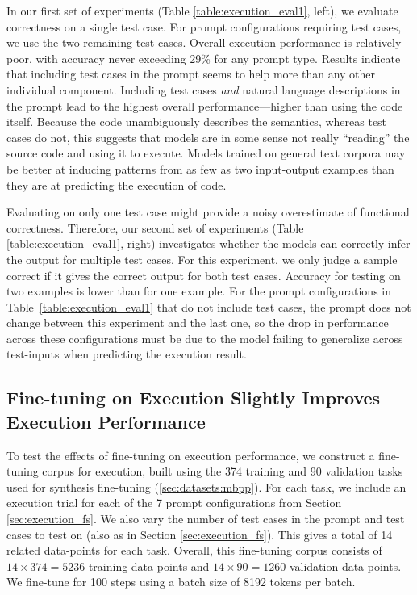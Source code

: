 In our first set of experiments (Table \ref{table:execution_eval1}, left), we evaluate correctness on a single test case. For prompt configurations requiring test cases, we use the two remaining test cases. Overall execution performance is relatively poor, with accuracy never exceeding 29\% for any prompt type. Results indicate that including test cases in the prompt seems to help more than any other individual component. Including test cases \textit{and} natural language descriptions in the prompt lead to the highest overall performance---higher than using the code itself. Because the code unambiguously describes the semantics, whereas test cases do not, this suggests that models are in some sense not really ``reading'' the source code and using it to execute. Models trained on general text corpora may be better at inducing patterns from as few as two input-output examples than they are at predicting the execution of code. 

Evaluating on only one test case might provide a noisy overestimate of functional correctness. Therefore, our second set of experiments (Table \ref{table:execution_eval1}, right) investigates whether the models can correctly infer the output for multiple test cases. For this experiment, we only judge a sample correct if it gives the correct output for both test cases. Accuracy for testing on two examples is lower than for one example. For the prompt configurations in Table~\ref{table:execution_eval1} that do not include test cases, the prompt does not change between this experiment and the last one, so the drop in performance across these configurations must be due to the model failing to generalize across test-inputs when predicting the execution result.

\subsection{Fine-tuning on Execution Slightly Improves Execution Performance}
\label{sec:execution_ft}
To test the effects of fine-tuning on execution performance, we construct a fine-tuning corpus for execution, built using the 374 training and 90 validation tasks used for synthesis fine-tuning (\autoref{sec:datasets:mbpp}).
For each task, we include an execution trial for each of the 7 prompt configurations from Section \ref{sec:execution_fs}.
We also vary the number of test cases in the prompt and test cases to test on (also as in Section \ref{sec:execution_fs}).
This gives a total of 14 related data-points for each task. Overall, this fine-tuning corpus consists of $14 \times 374 = 5236$ training data-points and $14 \times 90 = 1260$ validation data-points. We fine-tune for 100 steps using a batch size of 8192 tokens per batch.

